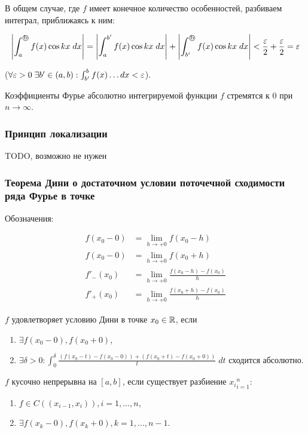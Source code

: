 В общем случае, где $f$ имеет конечное количество особенностей, разбиваем интеграл, приближаясь к ним:

\begin{equation*}
    \left| \int_a^{\text{\textcircled{b}}} f(x) \cos kx \;dx \right| = \left|\int_a^{b'} f(x) \cos kx \;dx\right| + \left|\int_{b'}^{\text{\textcircled{b}}} f(x) \cos kx \;dx\right| < \frac{\varepsilon}{2} + \frac{\varepsilon}{2} = \varepsilon
\end{equation*}

($\forall \varepsilon > 0 \; \exists b' \in (a, b): \int_{b'}^b f(x) \dots dx < \varepsilon$).

\Endproof

\Consequence Коэффициенты Фурье абсолютно интегрируемой функции $f$ стремятся к 0 при $n \to \infty$.

\subsubsection{Принцип локализации}

TODO, возможно не нужен

\subsubsection{Теорема Дини о достаточном условии поточечной сходимости ряда Фурье в точке}

Обозначения:

\begin{align*}
    f(x_0 - 0) &= \lim_{h \to +0} f(x_0 - h) \\
    f(x_0 - 0) &= \lim_{h \to +0} f(x_0 + h) \\
    f'_{-}(x_0) &= \lim_{h \to +0} \frac{f(x_0 - h) - f(x_0)}{h} \\
    f'_{+}(x_0) &= \lim_{h \to +0} \frac{f(x_0 + h) - f(x_0)}{h}
\end{align*}

\Def $f$ удовлетворяет условию Дини в точке $x_0 \in \mathbb{R}$, если

\begin{enumerate}
    \item $\exists f(x_0-0), f(x_0+0)$,
    \item $\exists \delta > 0 : \int_0^\delta \frac{(f(x_0-t)-f(x_0-0)) + (f(x_0+t)-f(x_0+0))}{t} \; dt$ сходится абсолютно.
\end{enumerate}

\Def $f$ кусочно непрерывна на $[a, b]$, если существует разбиение ${x_i}_{i=1}^n$:
\begin{enumerate}
    \item $f \in C((x_{i-1}, x_i)), i = 1, \dots, n$,
    \item $\exists f(x_k-0), f(x_k+0), k = 1, \dots, n-1$.
\end{enumerate}

